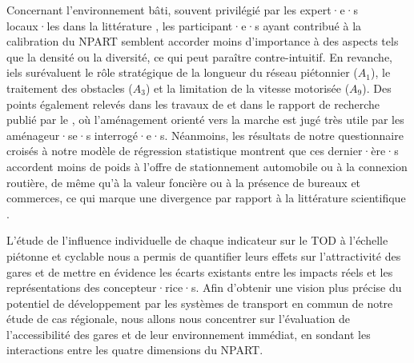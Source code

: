 \begin{refsegment}
Concernant l'environnement bâti, souvent privilégié par les expert·e·s locaux·les dans la littérature \textcolor{blue}{\autocite[41]{lukman_development_2014}}, les participant·e·s ayant contribué à la calibration du \acrshort{NPART} semblent accorder moins d’importance à des aspects tels que la densité ou la diversité, ce qui peut paraître contre-intuitif. En revanche, iels surévaluent le rôle stratégique de la longueur du réseau piétonnier (\(A_{1}\)), le traitement des obstacles (\(A_{3}\)) et la limitation de la vitesse motorisée (\(A_{9}\)). Des points également relevés dans les travaux de \textcolor{blue}{\textcite[2~430]{kumar_developing_2020}} et dans le rapport de recherche publié par le \textcolor{blue}{\textcite[19]{transportation_research_board_transit-oriented_2005}}, où l'aménagement orienté vers la marche est jugé très utile par les aménageur·se·s interrogé·e·s. Néanmoins, les résultats de notre questionnaire croisés à notre modèle de régression statistique montrent que ces dernier·ère·s accordent moins de poids à l'offre de stationnement automobile ou à la connexion routière, de même qu'à la valeur foncière ou à la présence de bureaux et commerces, ce qui marque une divergence par rapport à la littérature scientifique \textcolor{blue}{\autocites[19]{transportation_research_board_transit-oriented_2005}[42]{lukman_development_2014}[95]{caset_planning_2019}}.%

L'étude de l'influence individuelle de chaque indicateur sur le \acrshort{TOD} à l'échelle piétonne et cyclable nous a permis de quantifier leurs effets sur l'attractivité des gares et de mettre en évidence les écarts existants entre les impacts réels et les représentations des concepteur·rice·s. Afin d'obtenir une vision plus précise du potentiel de développement par les systèmes de transport en commun de notre étude de cas régionale,  nous allons nous concentrer sur l'évaluation de l'accessibilité des gares et de leur environnement immédiat, en sondant les interactions entre les quatre dimensions du \acrshort{NPART}.%


\end{refsegment}
